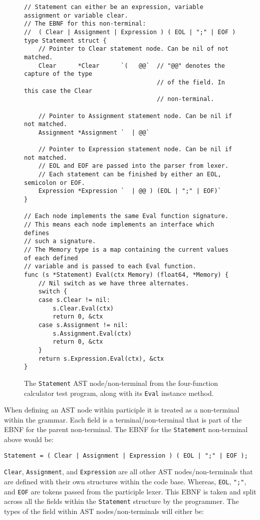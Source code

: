 \begin{figure}[H]
    \begin{verbatim}
// Statement can either be an expression, variable assignment or variable clear.
// The EBNF for this non-terminal:
//  ( Clear | Assignment | Expression ) ( EOL | ";" | EOF )
type Statement struct {
    // Pointer to Clear statement node. Can be nil of not matched.
    Clear      *Clear      `(   @@`  // "@@" denotes the capture of the type 
                                     // of the field. In this case the Clear
                                     // non-terminal.

    // Pointer to Assignment statement node. Can be nil if not matched.
    Assignment *Assignment `  | @@`

    // Pointer to Expression statement node. Can be nil if not matched.
    // EOL and EOF are passed into the parser from lexer.
    // Each statement can be finished by either an EOL, semicolon or EOF.
    Expression *Expression `  | @@ ) (EOL | ";" | EOF)`
}

// Each node implements the same Eval function signature.
// This means each node implements an interface which defines
// such a signature.
// The Memory type is a map containing the current values of each defined
// variable and is passed to each Eval function.
func (s *Statement) Eval(ctx Memory) (float64, *Memory) {
    // Nil switch as we have three alternates.
    switch {
    case s.Clear != nil:
        s.Clear.Eval(ctx)
        return 0, &ctx
    case s.Assignment != nil:
        s.Assignment.Eval(ctx)
        return 0, &ctx
    }
    return s.Expression.Eval(ctx), &ctx
}
    \end{verbatim}
    \label{fig:four-func-calc-statement-ast-node}
    \cprotect\caption{The \verb|Statement| AST node/non-terminal from the four-function calculator test program, along with its \verb|Eval| instance method.}
\end{figure}

When defining an AST node within participle it is treated as a non-terminal within the grammar. Each field is a terminal/non-terminal that is part of the EBNF for the parent non-terminal. The EBNF for the \verb|Statement| non-terminal above would be:

\begin{verbatim}
Statement = ( Clear | Assignment | Expression ) ( EOL | ";" | EOF );
\end{verbatim}

\verb|Clear|, \verb|Assignment|, and \verb|Expression| are all other AST nodes/non-terminals that are defined with their own structures within the code base. Whereas, \verb|EOL|, \verb|";"|, and \verb|EOF| are tokens passed from the participle lexer. This EBNF is taken and split across all the fields within the \verb|Statement| structure by the programmer. The types of the field within AST nodes/non-terminals will either be:

